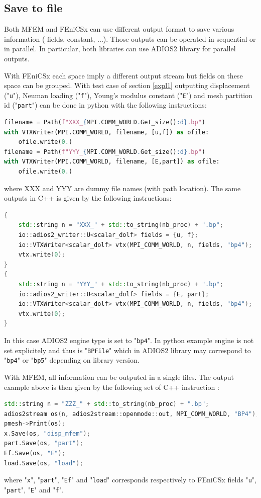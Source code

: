 \documentclass[12pt]{article}
\newcommand{\f}[1]{FEniCSx#1}
\newcommand{\mycode}[1]{\textsf{"}\lstinline`#1`\textsf{"}}
\newcommand{\mycodepy}[1]{\textsf{"}\lstinline[language=Python]`#1`\textsf{"}}
\begin{document}
\subsection{Save to file}
Both MFEM and \f{} can use different output format to save various information ( fields, constant, ...). 
Those outputs can be operated in sequential or in parallel. 
In particular, both libraries can use ADIOS2 library for parallel outputs.

With \f{} each space imply a different output stream but fields on these space can be grouped.
With test case  of section \ref{expl1}  outputting displacement (\mycodepy{u}), Neuman loading (\mycodepy{f}), Young's modulus constant (\mycodepy{E}) and mesh partition id (\mycodepy{part}) can be done in python with the following instructions:
\begin{lstlisting}[numbers=none,basicstyle=\footnotesize,language=python]
filename = Path(f"XXX_{MPI.COMM_WORLD.Get_size():d}.bp")
with VTXWriter(MPI.COMM_WORLD, filename, [u,f]) as ofile:
	ofile.write(0.)
filename = Path(f"YYY_{MPI.COMM_WORLD.Get_size():d}.bp")
with VTXWriter(MPI.COMM_WORLD, filename, [E,part]) as ofile:
	ofile.write(0.)
\end{lstlisting}   
where XXX and YYY are dummy file names (with path location). The same outputs in C++ is given by the following instructions:
\begin{lstlisting}[numbers=none,basicstyle=\footnotesize,language=c++]
{
	std::string n = "XXX_" + std::to_string(nb_proc) + ".bp";
	io::adios2_writer::U<scalar_dolf> fields = {u, f};
	io::VTXWriter<scalar_dolf> vtx(MPI_COMM_WORLD, n, fields, "bp4");
	vtx.write(0);
}
{
	std::string n = "YYY_" + std::to_string(nb_proc) + ".bp";
	io::adios2_writer::U<scalar_dolf> fields = {E, part};
	io::VTXWriter<scalar_dolf> vtx(MPI_COMM_WORLD, n, fields, "bp4");
	vtx.write(0);
}
\end{lstlisting}
In this case ADIOS2 engine type is set to \mycode{bp4}. In python example engine is not set explicitely and thus is \mycode{BPFile} which in ADIOS2 library may correspond to  \mycode{bp4} or \mycode{bp5} depending on library version.

With MFEM, all information can be outputed in a single files. The output example above is then given by the following set of C++ instruction :       
\begin{lstlisting}[numbers=none,basicstyle=\footnotesize,language=c++]
std::string n = "ZZZ_" + std::to_string(nb_proc) + ".bp";
adios2stream os(n, adios2stream::openmode::out, MPI_COMM_WORLD, "BP4");
pmesh->Print(os);
x.Save(os, "disp_mfem");
part.Save(os, "part");
Ef.Save(os, "E");
load.Save(os, "load");
\end{lstlisting} 
where \mycode{x}, \mycode{part}, \mycode{Ef} and \mycode{load} corresponds respectively to \f{} fields  \mycode{u}, \mycode{part}, \mycode{E} and \mycode{f}.
\end{document}
